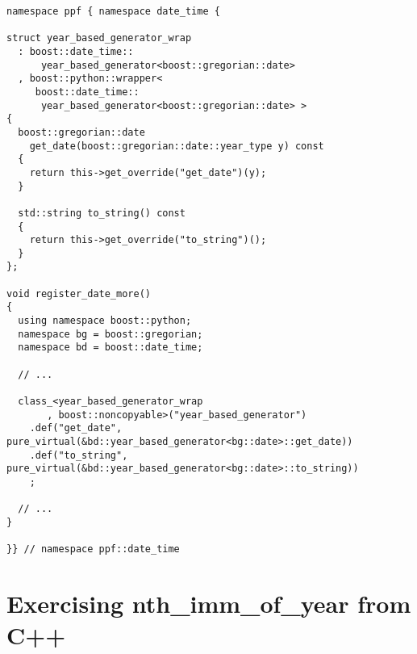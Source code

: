 \begin{verbatim}
namespace ppf { namespace date_time {

struct year_based_generator_wrap
  : boost::date_time::
      year_based_generator<boost::gregorian::date>
  , boost::python::wrapper<
     boost::date_time::
      year_based_generator<boost::gregorian::date> >
{
  boost::gregorian::date
    get_date(boost::gregorian::date::year_type y) const
  {
    return this->get_override("get_date")(y);
  }

  std::string to_string() const
  {
    return this->get_override("to_string")();
  }
};

void register_date_more()
{
  using namespace boost::python;
  namespace bg = boost::gregorian;
  namespace bd = boost::date_time;

  // ...

  class_<year_based_generator_wrap
       , boost::noncopyable>("year_based_generator")
    .def("get_date", pure_virtual(&bd::year_based_generator<bg::date>::get_date))
    .def("to_string", pure_virtual(&bd::year_based_generator<bg::date>::to_string))
    ;

  // ...
}

}} // namespace ppf::date_time
\end{verbatim}

\section{Exercising nth\_imm\_of\_year from C++}

